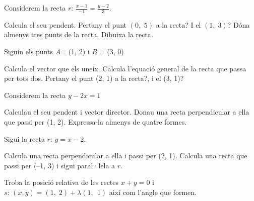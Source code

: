 \newpage	
\begin{activitats}
	
	\begin{mylist}	
		
		\exer  Considerem la recta  $r:\,  \frac{x-1}{-1} =\frac{y-2}{3} $. 
	
	\begin{tasks}
		\task  Calcula el seu pendent.
		\task  Pertany el punt $\left(0,\, \, 5\right)$ a la recta? I el $\left(1,\; 3\right)$?
		\task  Dóna almenys tres punts de la recta.
		\task  Dibuixa la recta.
	\end{tasks}

\answers{[$m=-3$, $(0,5)\in r$; $(1,3)\notin r$, $(x,y)=(1,2)+\lambda(-1,3)$,
	Gràfic]}
	
	\exer  Siguin els punts \textit{A}= (1, 2) i \textit{B} = (3, 0)
	\begin{tasks}
		\task  Calcula el vector que els uneix.
		\task  Calcula l'equació general de la recta que passa per tots dos.
		\task  Pertany el punt (2, 1) a la recta?, i el (3, 1)?
	\end{tasks}
		
		\answers{[$\overrightarrow{AB}=(2,-2)$, $\frac{x-1}{2}=\frac{y-2}{-2}$, $(2,1)\in r$; $(3,1)\notin r$]}
		
			
		\exer  Considerem la recta $y-2x=1$
		
		\begin{tasks}
			\task  Calculau el seu pendent i vector director.
			\task  Donau una recta perpendicular a ella que passi per (1, 2). Expressa-la almenys de quatre formes.
		\end{tasks}
		
		\answers{[$m=2$; $\vec d =(1,2)$, $\frac{x-1}{-2}=\frac{y-2}{1}$]}
		
		\exer  Sigui la recta $r:\,  y=x-2$.
		
		\begin{tasks}
			\task  Calcula una recta perpendicular a ella i passi per (2, 1).
			\task  Calcula una recta que passi per (--1, 3) i sigui paral·lela a  $r$.
		\end{tasks}
	
	\answers{[$y=-x+3$, $y=x+4$]}
		
		\exer  Troba la posició relativa de les rectes $x+y=0$ i $s:\,  \left(x,y\right)=\left(1,\; 2\right)+\lambda \left(1,\, \; 1\right)$ així com l'angle que formen.
		

\end{mylist}
\end{activitats}
